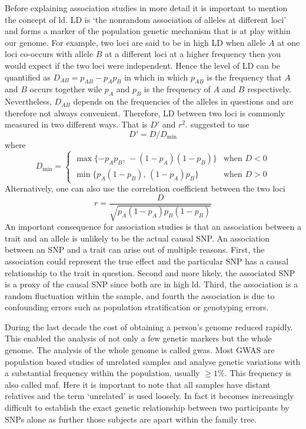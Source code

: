 Before explaining association studies in more detail it is important to mention the concept of \acrfull{ld}.
LD is `the nonrandom association of alleles at different loci'~\cite{Slatkin2008} and forms a marker of the population genetic mechanism that is at play within our genome.
For example, two loci are said to be in high LD when allele $A$ at one loci co-occurs with allele $B$ at a different loci at a higher frequency then you would expect if the two loci were independent.
Hence the level of LD can be quantified as $D_{AB}=p_{AB} - p_{A}p_{B}$ in which in which $p_{AB}$ is the frequency that $A$ and $B$ occurs together wile $p_A$ and $p_B$ is the frequency of $A$ and $B$ respectively.
Nevertheless, $D_{AB}$ depends on the frequencies of the alleles in questions and are therefore not always convenient.
Therefore, LD between two loci is commonly measured in two different ways. 
That is $D'$ and $r^2$.
\citet{Lewontin1964} suggested to use
\begin{equation}\label{eq:dprime}
  D' = D/D_{\min}
\end{equation}
where 
\begin{equation*}
  D_{\min}= \begin{cases}
    \max\{-p_A p_B,\,-(1-p_A)(1-p_B)\} & \text{when } D < 0\\
    \min\{p_A (1-p_B),\,(1-p_A) p_B\} & \text{when } D > 0
  \end{cases} 
\end{equation*}
Alternatively, one can also use the correlation coefficient between the two loci 
\begin{equation}\label{eq:r2}
  r=\frac{D}{\sqrt{p_A(1-p_A)p_B (1-p_B)}}
\end{equation}
An important consequence for association studies is that an association between a trait and an allele is unlikely to be the actual causal SNP\@.
An association between an SNP and a trait can arise out of multiple reasons.
First, the association could represent the true effect and the particular SNP has a causal relationship to the trait in question.
Second and more likely, the associated SNP is a proxy of the causal SNP since both are in high \acrshort{ld}.
Third, the association is a random fluctuation within the sample, and 
fourth the association is due to confounding errors such as population stratification or genotyping errors.

During the last decade the cost of obtaining a person's genome reduced rapidly.
This enabled the analysis of not only a few genetic markers but the whole genome.
The analysis of the whole genome is called \acrfull{gwas}.
Most GWAS are population based studies of unrelated samples and analyse genetic variations with a substantial frequency within the population, usually $\ge 1\%$.
This frequency is also called \acrfull{maf}.
Here it is important to note that all samples have distant relatives and the term `unrelated' is used loosely.
In fact it becomes increasingly difficult to establish the exact genetic relationship between two participants by SNPs alone as further those subjects are apart within the family tree.

